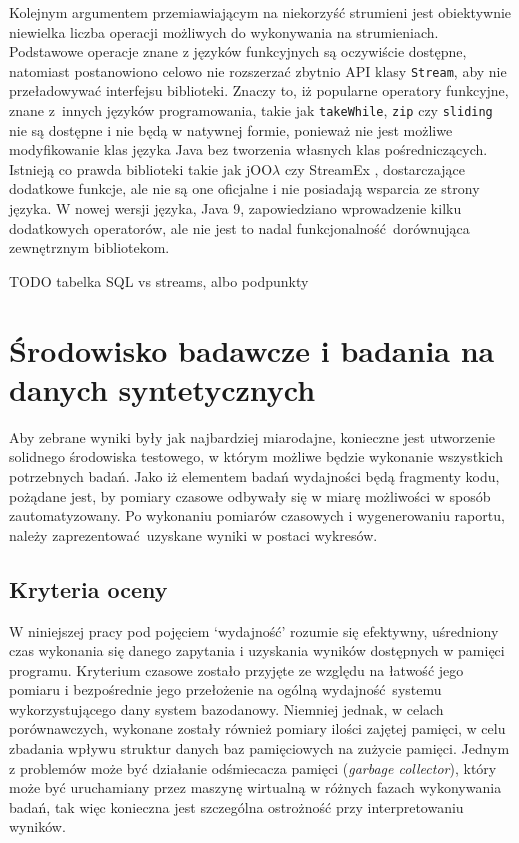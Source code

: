 \documentclass[12pt,twoside,openright]{extarticle}
\begin{document}
    Kolejnym argumentem przemiawiającym na niekorzyść strumieni jest obiektywnie niewielka liczba operacji możliwych do wykonywania na strumieniach. Podstawowe operacje znane z języków funkcyjnych są oczywiście dostępne, natomiast postanowiono celowo nie rozszerzać zbytnio API klasy \texttt{Stream}, aby nie przeładowywać interfejsu biblioteki. Znaczy to, iż popularne operatory funkcyjne, znane z~innych języków programowania, takie jak \texttt{takeWhile}, \texttt{zip} czy \texttt{sliding} nie są dostępne i nie będą w natywnej formie, ponieważ nie jest możliwe modyfikowanie klas języka Java bez tworzenia własnych klas pośredniczących. Istnieją co prawda biblioteki takie jak jOO$\lambda$ \cite{joolambda} czy StreamEx \cite{streamex}, dostarczające dodatkowe funkcje, ale nie są one oficjalne i nie posiadają wsparcia ze strony języka. W nowej wersji języka, Java 9, zapowiedziano wprowadzenie kilku dodatkowych operatorów, ale nie jest to nadal funkcjonalność dorównująca zewnętrznym bibliotekom.

    TODO tabelka SQL vs streams, albo podpunkty

\section{Środowisko badawcze i badania na danych syntetycznych}

    Aby zebrane wyniki były jak najbardziej miarodajne, konieczne jest utworzenie solidnego środowiska testowego, w którym możliwe będzie wykonanie wszystkich potrzebnych badań. Jako iż elementem badań wydajności będą fragmenty kodu, pożądane jest, by pomiary czasowe odbywały się w miarę możliwości w sposób zautomatyzowany. Po wykonaniu pomiarów czasowych i wygenerowaniu raportu, należy zaprezentować uzyskane wyniki w postaci wykresów.

\subsection{Kryteria oceny}

    W niniejszej pracy pod pojęciem `wydajność' rozumie się efektywny, uśredniony czas wykonania się danego zapytania i uzyskania wyników dostępnych w pamięci programu. Kryterium czasowe zostało przyjęte ze względu na łatwość jego pomiaru i bezpośrednie jego przełożenie na ogólną wydajność systemu wykorzystującego dany system bazodanowy. Niemniej jednak, w celach porównawczych, wykonane zostały również pomiary ilości zajętej pamięci, w celu zbadania wpływu struktur danych baz pamięciowych na zużycie pamięci. Jednym z problemów może być działanie odśmiecacza pamięci (\textit{garbage collector}), który może być uruchamiany przez maszynę wirtualną w różnych fazach wykonywania badań, tak więc konieczna jest szczególna ostrożność przy interpretowaniu wyników.
\end{document}
